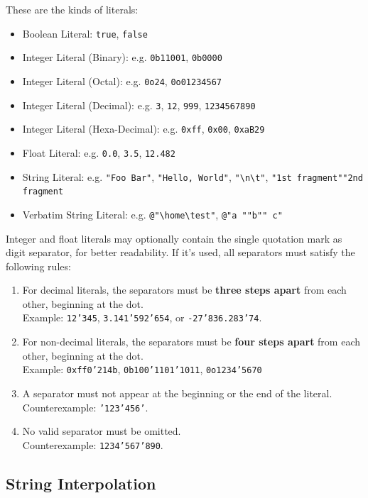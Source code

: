 \documentclass[a5paper]{report}
\begin{document}
These are the kinds of literals:
\begin{itemize}
	\item Boolean Literal: \texttt{true}, \texttt{false}
	\item Integer Literal (Binary): e.g. \texttt{0b11001}, \texttt{0b0000}
	\item Integer Literal (Octal): e.g. \texttt{0o24}, \texttt{0o01234567}
	\item Integer Literal (Decimal): e.g. \texttt{3}, \texttt{12}, \texttt{999}, \texttt{1234567890}
	\item Integer Literal (Hexa-Decimal): e.g. \texttt{0xff}, \texttt{0x00}, \texttt{0xaB29}
	\item Float Literal: e.g. \texttt{0.0}, \texttt{3.5}, \texttt{12.482}
	\item String Literal: e.g. \texttt{"Foo Bar"}, \texttt{"Hello, World"}, \texttt{"\textbackslash n\textbackslash t"},
		\texttt{"1st fragment"\textvisiblespace"2nd fragment}
	\item Verbatim String Literal: e.g. \texttt{@"\textbackslash home\textbackslash test"}, \texttt{@"a ""b"" c"}
\end{itemize}
Integer and float literals may optionally contain the single quotation mark as digit separator, for better readability.
If it's used, all separators must satisfy the following rules:
\begin{enumerate}
	\item For decimal literals, the separators must be \textbf{three steps apart} from each other, beginning at the dot. \\
		Example: \texttt{12'345}, \texttt{3.141'592'654}, or \texttt{-27'836.283'74}.
	\item For non-decimal literals, the separators must be \textbf{four steps apart} from each other, beginning at the dot. \\
		Example: \texttt{0xff0'214b}, \texttt{0b100'1101'1011}, \texttt{0o1234'5670}
	\item A separator must not appear at the beginning or the end of the literal. \\
		Counterexample: \texttt{'123'456'}.
	\item No valid separator must be omitted. \\
		Counterexample: \texttt{1234'567'890}.
\end{enumerate}

\subsection{String Interpolation}
\end{document}
